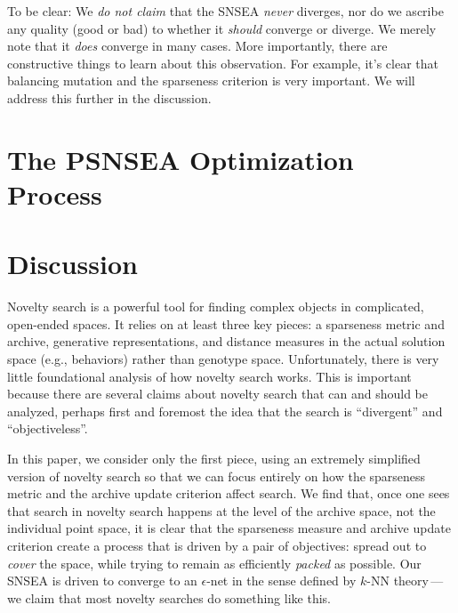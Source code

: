 \documentclass[twoside]{article}
\begin{document}
To be clear:  We \emph{do not claim} that the SNSEA \emph{never} diverges, nor do we ascribe any quality (good or bad) to whether it \emph{should} converge or diverge.  We merely note that it \emph{does} converge in many cases.  More importantly, there are constructive things to learn about this observation.  For example, it's clear that balancing mutation and the sparseness criterion is very important.  We will address this further in the discussion.


\section{The PSNSEA Optimization Process}
\label{sec:resultpsnesea}



\section{Discussion}
\label{sec:discussion}

Novelty search is a powerful tool for finding complex objects in complicated, open-ended spaces.  It relies on at least three key pieces:  a sparseness metric and archive, generative representations, and distance measures in the actual solution space (e.g., behaviors) rather than genotype space.  Unfortunately, there is very little foundational analysis of how novelty search works.  This is important because there are several claims about novelty search that can and should be analyzed, perhaps first and foremost the idea that the search is ``divergent'' and ``objectiveless''.  

In this paper, we consider only the first piece, using an extremely simplified version of novelty search so that we can focus entirely on how the sparseness metric and the archive update criterion affect search.  We find that, once one sees that search in novelty search happens at the level of the archive space, not the individual point space, it is clear that the sparseness measure and archive update criterion create a process that is driven by a pair of objectives:  spread out to \emph{cover} the space, while trying to remain as efficiently \emph{packed} as possible.  Our SNSEA is driven to converge to an $\epsilon$-net in the sense defined by $k$-NN theory\,---\,we claim that most novelty searches do something like this.
\end{document}
